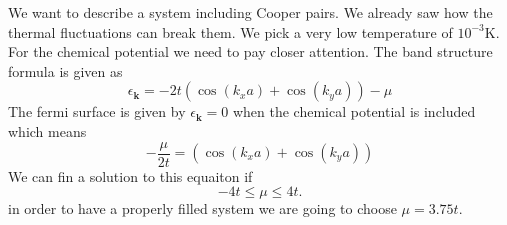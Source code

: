 \documentclass[../main.tex]{subfile}
\begin{document}
We want to describe a system including Cooper pairs. We already saw how the thermal fluctuations can break them. We pick 
a very low temperature of $10^{-3}\si{\kelvin}$. For the chemical potential we need to pay closer attention. 
The band structure formula is given as
\begin{equation*}
    \epsilon_{\bm{k}} = -2t\left(\cos(k_x a) + \cos(k_y a)\right) - \mu
\end{equation*}
The fermi surface is given by $\epsilon_{\bm{k}}=0$ when the chemical potential is included which means
\begin{equation*}
    -\frac{\mu}{2t} = \left(\cos(k_x a) + \cos(k_y a)\right)
\end{equation*}
We can fin a solution to this equaiton if 
\begin{equation*}
    -4t\le \mu \le 4t.
\end{equation*}
in order to have a properly filled system we are going to choose $\mu = 3.75 t$.\\

%     
\end{document}
